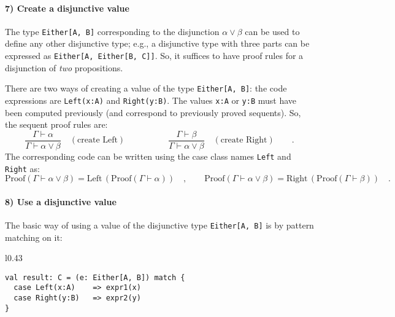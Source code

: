 \paragraph{7) Create a disjunctive value}

The type \lstinline!Either[A, B]! corresponding to the disjunction
$\alpha\vee\beta$ can be used to define any other disjunctive type;
e.g., a disjunctive type with three parts can be expressed as \lstinline!Either[A, Either[B, C]]!.
So, it suffices to have proof rules for a disjunction of \emph{two}
propositions.

There are two ways of creating a value of the type \lstinline!Either[A, B]!:
the code expressions are \lstinline!Left(x:A)! and \lstinline!Right(y:B)!.
The values \lstinline!x:A! or \lstinline!y:B! must have been computed
previously (and correspond to previously proved sequents). So, the
sequent proof rules are:
\[
\frac{\Gamma\vdash\alpha}{\Gamma\vdash\alpha\vee\beta}\quad(\text{create Left})\quad\quad\quad\quad\quad\frac{\Gamma\vdash\beta}{\Gamma\vdash\alpha\vee\beta}\quad(\text{create Right})\quad\quad.
\]
The corresponding code can be written using the case class names \lstinline!Left!
and \lstinline!Right! as:
\[
\text{Proof}\left(\Gamma\vdash\alpha\vee\beta\right)=\text{Left}\,(\text{Proof}\left(\Gamma\vdash\alpha\right))\quad,\quad\quad\text{Proof}\left(\Gamma\vdash\alpha\vee\beta\right)=\text{Right}\,(\text{Proof}\left(\Gamma\vdash\beta\right))\quad.
\]


\paragraph{8) Use a disjunctive value}

The basic way of using a value of the disjunctive type \lstinline!Either[A, B]!
is by pattern matching on it:

\begin{wrapfigure}{l}{0.43\columnwidth}%
\vspace{-0.6\baselineskip}
\begin{lstlisting}
val result: C = (e: Either[A, B]) match {
  case Left(x:A)    => expr1(x)
  case Right(y:B)   => expr2(y)
}
\end{lstlisting}

\vspace{-0.9\baselineskip}
\end{wrapfigure}%


